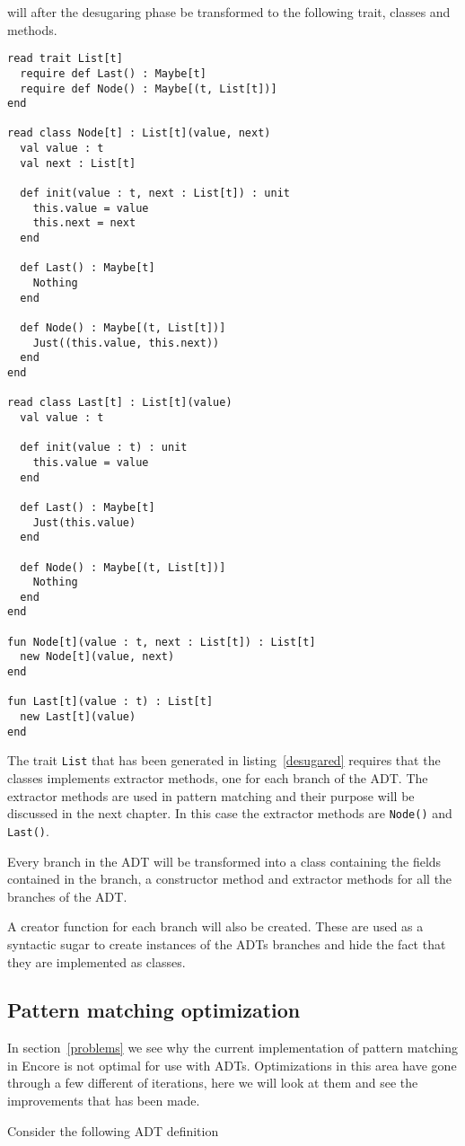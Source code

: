 \documentclass[10pt]{report}
\def\code#1{\texttt{#1}} %
\begin{document}
\par{will after the desugaring phase be transformed to the following trait, classes and methods.}

\begin{lstlisting}[language=encore,caption={Desugared linked list},label=desugared]
read trait List[t]
  require def Last() : Maybe[t]
  require def Node() : Maybe[(t, List[t])]
end

read class Node[t] : List[t](value, next)
  val value : t
  val next : List[t]

  def init(value : t, next : List[t]) : unit
    this.value = value
    this.next = next
  end

  def Last() : Maybe[t]
    Nothing
  end

  def Node() : Maybe[(t, List[t])]
    Just((this.value, this.next))
  end
end

read class Last[t] : List[t](value)
  val value : t

  def init(value : t) : unit
    this.value = value
  end

  def Last() : Maybe[t]
    Just(this.value)
  end

  def Node() : Maybe[(t, List[t])]
    Nothing
  end
end

fun Node[t](value : t, next : List[t]) : List[t]
  new Node[t](value, next)
end

fun Last[t](value : t) : List[t]
  new Last[t](value)
end

\end{lstlisting}

\par{The trait \code{List} that has been generated in listing~\ref{desugared} requires that the classes implements extractor methods, one for each branch of the ADT\@. The extractor methods are used in pattern matching and their purpose will be discussed in the next chapter. In this case the extractor methods are \code{Node()} and \code{Last()}.}

\par{Every branch in the ADT will be transformed into a class containing the fields contained in the branch, a constructor method and extractor methods for all the branches of the ADT.}

\par{A creator function for each branch will also be created. These are used as a syntactic sugar to create instances of the ADTs branches and hide the fact that they are implemented as classes.}

\subsection{Pattern matching optimization}
\label{ch:optimization}
\par{In section~\ref{problems} we see why the current implementation of pattern matching in Encore is not optimal for use with ADTs. Optimizations in this area have gone through a few different of iterations, here we will look at them and see the improvements that has been made.}
\par{Consider the following ADT definition}
\end{document}
